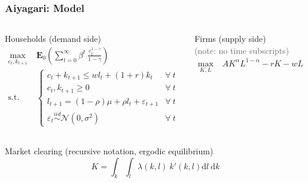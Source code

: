 \documentclass[10pt, aspectratio=1610, natbib, handout]{beamer}
\newcommand{\dimmer}[1]{\textcolor{dimgray}{#1}}
\newcommand{\E}{\mathbf{E}}
\begin{document}
  \begin{frame}
    \frametitle{Aiyagari: Model}

    \begin{columns}[T]
      \begin{column}{0.45\textwidth}
        Households (demand side)
        \begin{align*}
          \max_{c_t, k_{t+1}} &\; \E_0 \left( \sum_{t=0}^{\infty} \beta^t\ \frac{c_t^{1-\gamma}}{1-\gamma} \right) \\
          \text{s.t.} &\;
          \begin{cases}
            c_t + k_{t+1} \leq w l_t + (1 + r) k_t & \forall\ t \\
            c_t, k_{t+1} \geq 0 & \forall\ t \\
            l_{t+1} = (1 - \rho) \mu + \rho l_t + \varepsilon_{t+1} & \forall\ t \\
            \varepsilon_t \overset{iid}{\sim} \mathcal{N}(0, \sigma^2) & \forall\ t
          \end{cases}
        \end{align*}
      \end{column}
      \begin{column}{0.45\textwidth}
        Firms (supply side) \\ \dimmer{(note: no time subscripts)}
        \begin{align*}
          \max_{K, L} &\; A K^\alpha L^{1-\alpha} - r K - w L
        \end{align*}
      \end{column}
    \end{columns}

    \vfill\pause

    Market clearing (recursive notation, ergodic equilibrium)
    \begin{equation*}
      K = \int_{k} \int_{l} \lambda(k, l)\ k'(k, l) \text{d} l\ \text{d} k
    \end{equation*}

  \end{frame}
\end{document}

